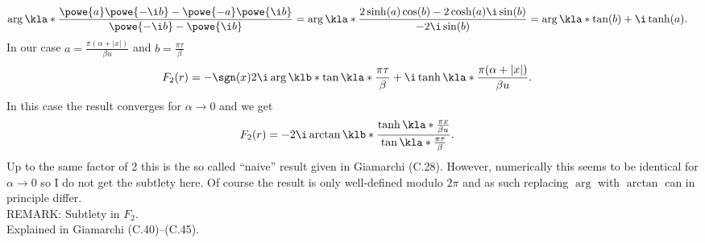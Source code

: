 \documentclass[english, parskip=full]{scrartcl}
\newcommand{\TODO}[1]{\color{red!60!black} #1\color{black}}
\begin{document}
\begin{align}
\arg \kla*{\frac{\powe{a}\powe{-\i b} - \powe{-a} \powe{\i b}}{\powe{-\i b} - \powe{\i b} }} &= \arg \kla*{\frac{2\sinh(a) \cos(b) - 2\cosh(a)  \i\sin(b)}{-2\i \sin(b)}} = \arg\kla*{\tan(b) + \i \tanh(a)}.
\end{align}
In our case $a = \frac{\pi (\alpha + |x|)}{\beta u}$ and $b = \frac{\pi\tau}{\beta}$
\begin{align}
F_2(r) &= -\sgn(x) 2\i \arg \klb*{\tan\kla*{\frac{\pi\tau}{\beta}} + \i \tanh \kla*{\frac{\pi (\alpha + |x|)}{\beta u}}}.
\end{align}
In this case the result converges for $\alpha \rightarrow 0$ and we get
\begin{align}
F_2(r) &= -2\i\arctan \klb*{\frac{\tanh \kla*{\frac{\pi x}{\beta u}} }{\tan \kla*{\frac{\pi\tau}{\beta }} }} .
\end{align}
\TODO{Up to the same factor of 2 this is the so called ``naive'' result given in Giamarchi (C.28).
However, numerically this seems to be identical for $\alpha \rightarrow 0$ so I do not get the subtlety here.
Of course the result is only well-defined modulo $2\pi$ and as such replacing $\arg$ with $\arctan$ can in principle differ.}\\
REMARK: Subtlety in $F_2$.\\
Explained in Giamarchi (C.40)--(C.45).
\end{document}
